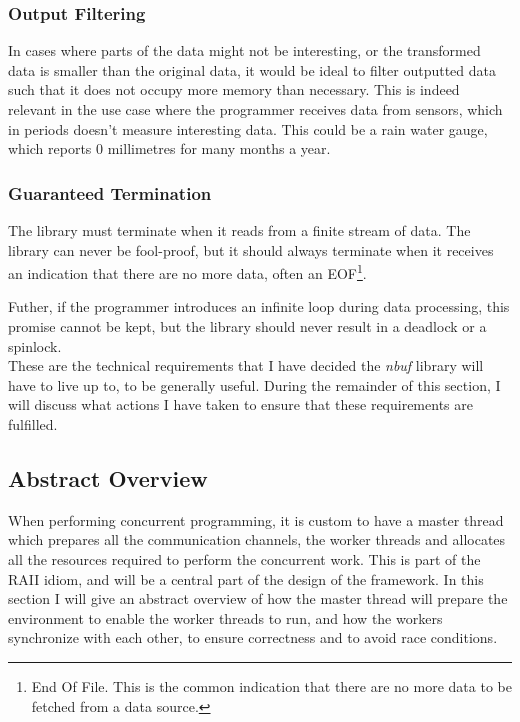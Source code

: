 \documentclass[a4paper]{article}
\newcommand{\nbuf}{\textit{nbuf} }
\begin{document}
\subsubsection{Output Filtering}
In cases where parts of the data might not be interesting, or the transformed data is smaller than the original data, it would be ideal to filter outputted data such that it does not occupy more memory than necessary. This is indeed relevant in the use case where the programmer receives data from sensors, which in periods doesn't measure interesting data. This could be a rain water gauge, which reports 0 millimetres for many months a year.


\subsubsection{Guaranteed Termination}
The library must terminate when it reads from a finite stream of data. The library can never be fool-proof, but it should always terminate when it receives an indication that there are no more data, often an EOF\footnote{End Of File. This is the common indication that there are no more data to be fetched from a data source.}.

Futher, if the programmer introduces an infinite loop during data processing, this promise cannot be kept, but the library should never result in a deadlock or a spinlock.\\


These are the technical requirements that I have decided the \nbuf library will have to live up to, to be generally useful. During the remainder of this section, I will discuss what actions I have taken to ensure that these requirements are fulfilled.



\newpage
\subsection{Abstract Overview}
When performing concurrent programming, it is custom to have a master thread which prepares all the communication channels, the worker threads and allocates all the resources required to perform the concurrent work. This is part of the RAII idiom, and will be a central part of the design of the framework. In this section I will give an abstract overview of how the master thread will prepare the environment to enable the worker threads to run, and how the workers synchronize with each other, to ensure correctness and to avoid race conditions.
\end{document}

